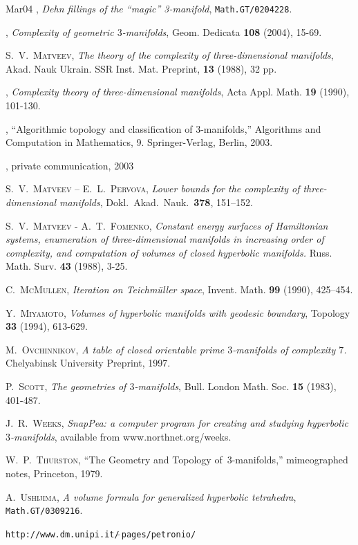 \documentclass[10pt]{article}      %
\begin{document}
\begin{thebibliography}{Mar04}
 \bysame,
  \emph{Dehn fillings of the ``magic'' 3-manifold}, {\tt Math.GT/0204228}.

 \bysame,
  \emph{Complexity of geometric $3$-manifolds},
Geom. Dedicata \textbf{108} (2004), 15-69.

 \textsc{S.~V.~Matveev}, {\em The theory of the
   complexity of three-dimensional manifolds}, Akad. Nauk Ukrain. SSR
   Inst. Mat. Preprint, \textbf{13} (1988), 32 pp.

 \bysame, \emph{Complexity theory of
  three-dimensional manifolds}, Acta Appl. Math. \textbf{19} (1990),
  101-130.

 \bysame,
``Algorithmic topology and classification of 3-manifolds,'' 
Algorithms and Computation in Mathematics, 9. Springer-Verlag, Berlin, 2003.

 \bysame, private communication, 2003

 \textsc{S.~V.~Matveev -- E.~L.~Pervova},
  \emph{Lower bounds for the complexity of three-dimensional manifolds},
  Dokl.~Akad.~Nauk.~\textbf{378}, 151--152.

 \textsc{S.~V.~Matveev - A.~T.~Fomenko}, \emph{Constant
energy surfaces of Hamiltonian systems, enumeration of three-dimensional
manifolds in increasing order of complexity, and computation of volumes of
closed hyperbolic manifolds.} Russ. Math. Surv. \textbf{43} (1988), 3-25.

 \textsc{C.~McMullen}, 
\emph{Iteration on Teichm\"uller space},  
Invent. Math.  \textbf{99}  (1990),  425--454.

 \textsc{Y.~Miyamoto},
\emph{Volumes of hyperbolic manifolds with geodesic boundary},
Topology \textbf{33} (1994), 613-629.

 \textsc{M.~Ovchinnikov}, \emph{A table of closed orientable
prime $3$-manifolds of complexity $7$.} Chelyabinsk University Preprint,
1997.

\textsc{P.~Scott}, 
  \emph{The geometries of $3$-manifolds}, Bull. London Math. Soc. 
  \textbf{15} (1983), 401-487.

\textsc{J.~R.~Weeks}, 
{\it SnapPea: a computer program for creating and studying
hyperbolic $3$-manifolds}, available from www.northnet.org/weeks.

\textsc{W.~P.~Thurston}, ``The Geometry and Topology
of $\,3$-manifolds,'' mimeographed notes, Princeton, 1979.

\textsc{A.~Ushijima},
\emph{A volume formula for generalized hyperbolic tetrahedra},
{\tt Math.GT/0309216}.

 {\tt http://www.dm.unipi.it/$\tilde{\ }$pages/petronio/}


\end{thebibliography}
\end{document}
